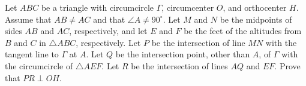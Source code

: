 Let $ABC$ be a triangle with circumcircle $\Gamma$, circumcenter $O$, and orthocenter $H$. Assume that $AB\neq AC$ and that $\angle A \neq 90^{\circ}$. Let $M$ and $N$ be the midpoints of sides $AB$ and $AC$, respectively, and let $E$ and $F$ be the feet of the altitudes from $B$ and $C$ in $\triangle ABC$, respectively. Let $P$ be the intersection of line $MN$ with the tangent line to $\Gamma$ at $A$. Let $Q$ be the intersection point, other than $A$, of $\Gamma$ with the circumcircle of $\triangle AEF$. Let $R$ be the intersection of lines $AQ$ and $EF$. Prove that $PR\perp OH$. 